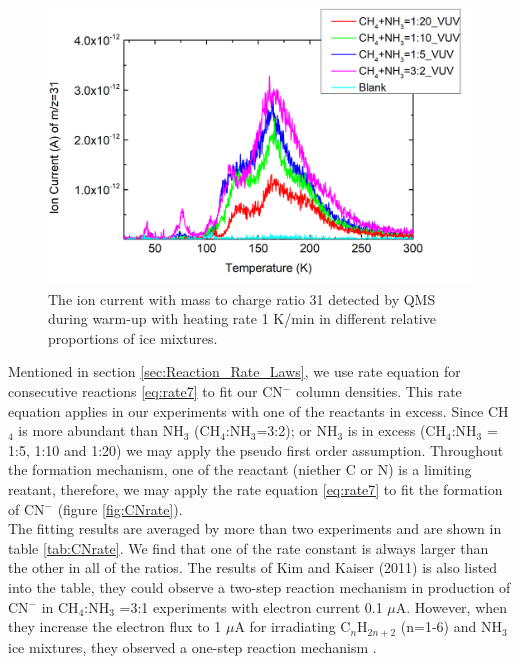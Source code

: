 \begin{figure}
\centering
\includegraphics[width=\textwidth]{figures/chapter3/mass31.png}
\caption{The ion current with mass to charge ratio 31 detected by QMS during warm-up with heating rate 1 K/min in different relative proportions of ice mixtures.}
\label{Mass31}
\end{figure}

Mentioned in section \ref{sec:Reaction_Rate_Laws}, we use rate equation for consecutive reactions \ref{eq:rate7} to fit our CN$^-$ column densities. This rate equation applies in our experiments with one of the reactants in excess. Since CH$_4$ is more abundant than NH$_3$ (CH$_4$:NH$_3$=3:2); or NH$_3$ is in excess (CH$_4$:NH$_3$ = 1:5, 1:10 and 1:20) we may apply the pseudo first order assumption. Throughout the formation mechanism, one of the reactant (niether C or N) is a limiting reatant, therefore, we may apply the rate equation \ref{eq:rate7} to fit the formation of CN$^-$ (figure \ref{fig:CNrate}).\\

The fitting results are averaged by more than two experiments and are shown in table \ref{tab:CNrate}. We find that one of the rate constant is always larger than the other in all of the ratios. The results of Kim and Kaiser (2011) is also listed into the table, they could observe a two-step reaction mechanism in production of CN$^-$ in CH$_4$:NH$_3$ =3:1 experiments with electron current 0.1 $\mu$A. However, when they increase the electron flux to 1 $\mu$A for irradiating C$_n$H$_{2n+2}$ (n=1-6) and NH$_3$ ice mixtures, they observed a one-step reaction mechanism \cite{kim}.\\

